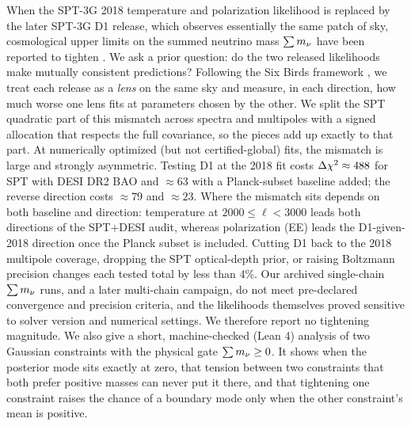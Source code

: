 \label{sec:abstract}
When the SPT-3G 2018 temperature and polarization likelihood is replaced by the later SPT-3G D1 release, which observes essentially the same patch of sky, cosmological upper limits on the summed neutrino mass $\sum m_\nu$ have been reported to tighten \cite{arxiv2601_16277}. We ask a prior question: do the two released likelihoods make mutually consistent predictions? Following the Six Birds framework \cite{sixbirds_foundations,sixbirds_darkenergy}, we treat each release as a \emph{lens} on the same sky and measure, in each direction, how much worse one lens fits at parameters chosen by the other. We split the SPT quadratic part of this mismatch across spectra and multipoles with a signed allocation that respects the full covariance, so the pieces add up exactly to that part. At numerically optimized (but not certified-global) fits, the mismatch is large and strongly asymmetric. Testing D1 at the 2018 fit costs $\Delta \chi^2\approx488$ for SPT with DESI DR2 BAO and $\approx63$ with a Planck-subset baseline added; the reverse direction costs $\approx79$ and $\approx23$. Where the mismatch sits depends on both baseline and direction: temperature at $2000\le\ell<3000$ leads both directions of the SPT+DESI audit, whereas polarization (EE) leads the D1-given-2018 direction once the Planck subset is included. Cutting D1 back to the 2018 multipole coverage, dropping the SPT optical-depth prior, or raising Boltzmann precision changes each tested total by less than 4\%. Our archived single-chain $\sum m_\nu$ runs, and a later multi-chain campaign, do not meet pre-declared convergence and precision criteria, and the likelihoods themselves proved sensitive to solver version and numerical settings. We therefore report no tightening magnitude. We also give a short, machine-checked (Lean 4) analysis of two Gaussian constraints with the physical gate $\sum m_\nu\ge0$. It shows when the posterior mode sits exactly at zero, that tension between two constraints that both prefer positive masses can never put it there, and that tightening one constraint raises the chance of a boundary mode only when the other constraint's mean is positive.
